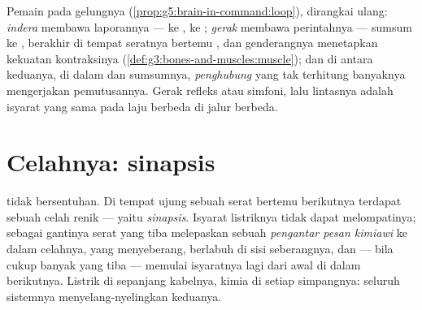 \begin{example}\label{ex:g8:nervous-communication:lines}
Pemain pada gelungnya (\cref{prop:g5:brain-in-command:loop}),
dirangkai ulang: \emph{ indera} membawa laporannya ---
 ke ,  ke ; \emph{
gerak} membawa perintahnya --- sumsum ke , berakhir di
tempat seratnya bertemu , dan genderangnya menetapkan
kekuatan kontraksinya
(\cref{def:g3:bones-and-muscles:muscle}); dan di antara
keduanya, di dalam  dan sumsumnya, \emph{
penghubung} yang tak terhitung banyaknya mengerjakan
pemutusannya. Gerak refleks atau simfoni, lalu lintasnya
adalah isyarat yang sama pada laju berbeda di jalur berbeda.
\end{example}

\section{Celahnya: sinapsis}

\begin{definition}[Sinapsis]\label{def:g8:nervous-communication:synapse}
 tidak bersentuhan. Di tempat ujung sebuah serat
bertemu  berikutnya terdapat sebuah celah renik --- yaitu
\emph{sinapsis}. Isyarat listriknya tidak
dapat melompatinya; sebagai gantinya serat yang tiba
melepaskan sebuah \emph{pengantar pesan kimiawi} ke dalam
celahnya, yang menyeberang, berlabuh di sisi seberangnya,
dan --- bila cukup banyak yang tiba --- memulai isyaratnya
lagi dari awal di dalam  berikutnya. Listrik di
sepanjang kabelnya, kimia di setiap simpangnya: seluruh
sistemnya menyelang-nyelingkan keduanya.
\end{definition}

